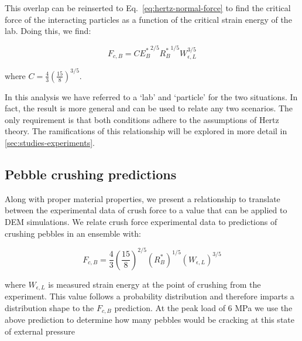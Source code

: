 This overlap can be reinserted to Eq.~\ref{eq:hertz-normal-force} to find the critical force of the interacting particles as a function of the critical strain energy of the lab. Doing this, we find:

\begin{equation}\label{eq:peb_hertz}
	F_{c,B} = C{E_B^*}^{2/5}{R_B^*}^{1/5}W_{\epsilon,L}^{3/5}
\end{equation}

where $C = \frac{4}{3}\left(\frac{15}{8}\right)^{3/5}$.

In this analysis we have referred to a `lab' and `particle' for the two situations. In fact, the result is more general and can be used to relate any two scenarios. The only requirement is that both conditions adhere to the assumptions of Hertz theory. The ramifications of this relationship will be explored in more detail in \cref{sec:studies-experiments}.




\subsection{Pebble crushing predictions}
Along with proper material properties, we present a relationship to translate between the experimental data of crush force to a value that can be applied to DEM simulations. We relate crush force experimental data to predictions of crushing pebbles in an ensemble with:

\begin{equation}\label{eq:crush-predict}
  F_{c,B} = \frac{4}{3} \left(\frac{15}{8}\right)^{2/5}\left(R_B^* \right)^{1/5}\left( W_{\epsilon,L} \right)^{3/5}
\end{equation}

where $W_{\epsilon,L}$ is measured strain energy at the point of crushing from the experiment. This value follows a probability distribution and therefore imparts a distribution shape to the $F_{c,B}$ prediction. At the peak load of 6 MPa we use the above prediction to determine how many pebbles would be cracking at this state of external pressure